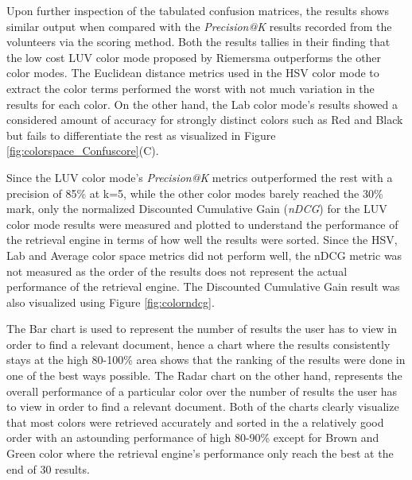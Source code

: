 Upon further inspection of the tabulated confusion matrices, the results shows similar output when compared with the \textit{Precision@K} results recorded from the volunteers via the scoring method. Both the results tallies in their finding that the low cost LUV color mode proposed by Riemersma\cite{riemersma} outperforms the other color modes. The Euclidean distance metrics used in the HSV color mode to extract the color terms performed the worst with not much variation in the results for each color. On the other hand, the Lab color mode's results showed a considered amount of accuracy for strongly distinct colors such as Red and Black but fails to differentiate the rest as visualized in Figure \ref{fig:colorspace_Confuscore}(C). 

Since the LUV color mode's \textit{Precision@K} metrics outperformed the rest with a precision of 85\% at k=5, while the other color modes barely reached the 30\% mark, only the normalized Discounted Cumulative Gain (\textit{nDCG}) for the LUV color mode results were measured and plotted to understand the performance of the retrieval engine in terms of how well the results were sorted. Since the HSV, Lab and Average color space metrics did not perform well, the nDCG metric was not measured as the order of the results does not represent the actual performance of the retrieval engine. The Discounted Cumulative Gain result was also visualized using Figure \ref{fig:colorndcg}.

The Bar chart is used to represent the number of results the user has to view in order to find a relevant document, hence a chart where the results consistently stays at the high 80-100\% area shows that the ranking of the results were done in one of the best ways possible. The Radar chart on the other hand, represents the overall performance of a particular color over the number of results the user has to view in order to find a relevant document. Both of the charts clearly visualize that most colors were retrieved accurately and sorted in the a relatively good order with an astounding performance of high 80-90\% except for Brown and Green color where the retrieval engine's performance only reach the best at the end of 30 results.


